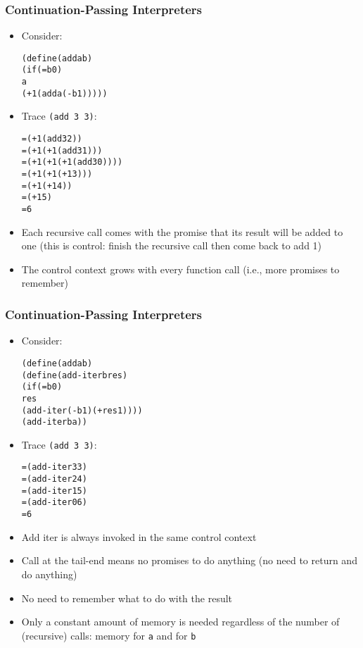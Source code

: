 \documentclass{beamer}
\begin{document}
\begin{frame}[fragile]
\frametitle{Continuation-Passing Interpreters}
\begin{scriptsize}
\begin{itemize}
\item<1-> Consider:
\begin{alltt}
(define (add a b)
	(if (= b 0)
        a
        (+ 1 (add a (- b 1)))))
\end{alltt}

\item<2-> Trace \texttt{(add 3 3)}:
\begin{alltt}
= (+ 1 (add 3 2))
= (+ 1 (+ 1 (add 3 1)))
= (+ 1 (+ 1 (+ 1 (add 3 0))))
= (+ 1 (+ 1 (+ 1 3)))	
= (+ 1 (+ 1 4))			
= (+ 1 5)			
= 6
\end{alltt}

\item<3-> Each recursive call comes with the promise that its result will be added to one (this is control: finish the recursive call then come back to add 1)

\item<3-> The control context grows with every function call (i.e., more promises to remember)


\end{itemize}
\end{scriptsize}
\end{frame}

\begin{frame}[fragile]
\frametitle{Continuation-Passing Interpreters}
\begin{scriptsize}
\begin{itemize}
\item<1-> Consider:
\begin{alltt}
(define (add a b)
	(define (add-iter b res)
	  (if (= b 0)
          res
          (add-iter (- b 1) (+ res 1))))
  (add-iter b a))
\end{alltt}

\item<2-> Trace \texttt{(add 3 3)}:
\begin{alltt}
= (add-iter 3 3)
= (add-iter 2 4)
= (add-iter 1 5)
= (add-iter 0 6)
= 6		
\end{alltt}

\item<3-> Add iter is always invoked in the same control context

\item<3-> Call at the tail-end means no promises to do anything (no need to return and do anything)

\item<3-> No need to remember what to do with the result

\item<3-> Only a constant amount of memory is needed regardless of the number of (recursive) calls: memory for \texttt{a} and for \texttt{b}

\end{itemize}
\end{scriptsize}
\end{frame}
\end{document}
